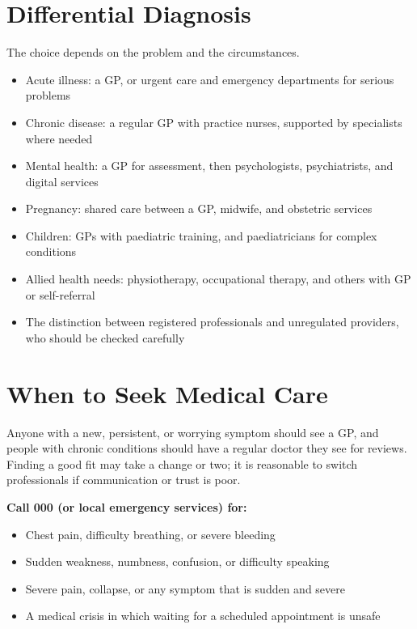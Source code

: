 \section*{Differential Diagnosis}
The choice depends on the problem and the circumstances.
\begin{itemize}
    \item Acute illness: a GP, or urgent care and emergency departments for serious problems
    \item Chronic disease: a regular GP with practice nurses, supported by specialists where needed
    \item Mental health: a GP for assessment, then psychologists, psychiatrists, and digital services
    \item Pregnancy: shared care between a GP, midwife, and obstetric services
    \item Children: GPs with paediatric training, and paediatricians for complex conditions
    \item Allied health needs: physiotherapy, occupational therapy, and others with GP or self-referral
    \item The distinction between registered professionals and unregulated providers, who should be checked carefully
\end{itemize}

\section*{When to Seek Medical Care}
Anyone with a new, persistent, or worrying symptom should see a GP, and people with chronic conditions should have a regular doctor they see for reviews. Finding a good fit may take a change or two; it is reasonable to switch professionals if communication or trust is poor.

\textbf{Call 000 (or local emergency services) for:}
\begin{itemize}
    \item Chest pain, difficulty breathing, or severe bleeding
    \item Sudden weakness, numbness, confusion, or difficulty speaking
    \item Severe pain, collapse, or any symptom that is sudden and severe
    \item A medical crisis in which waiting for a scheduled appointment is unsafe
\end{itemize}

